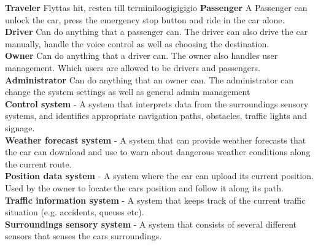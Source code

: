 \documentclass{article}
\begin{document}
\noindent
\textbf{Traveler} Flyttas hit, resten till terminiloogigigigio
\textbf{Passenger} A Passenger can unlock the car, press the emergency stop button and ride in the car alone.\\
\textbf{Driver} Can do anything that a passenger can.
The driver can also drive the car manually, handle the voice control as well as choosing the destination. \\
\textbf{Owner} Can do anything that a driver can. The owner also handles user management. Which users are allowed to be drivers and passengers. \\
\textbf{Administrator} Can do anything that an owner can.
The administrator can change the system settings as well as general admin management \\
\textbf{Control system} - A system that interprets data from the surroundings sensory systems, and identifies appropriate navigation paths, obstacles, traffic lights and signage. \\
\textbf{Weather forecast system} - A system that can provide weather forecasts that the car can download and use to warn about dangerous weather conditions along the current route.  \\
\textbf{Position data system} - A system where the car can upload its current position. Used by the owner to locate the cars position and follow it along its path.  \\
\textbf{Traffic information system} - A system that keeps track of the current traffic situation (e.g. accidents, queues etc). \\
\textbf{Surroundings sensory system} - A system that consists of several different sensors that senses the cars surroundings.  \\
\end{document}
